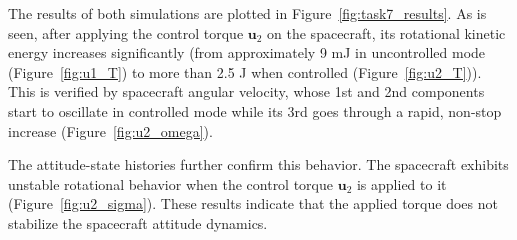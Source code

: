 \documentclass[12pt,a4paper]{report}
\begin{document}
	The results of both simulations are plotted in Figure~\ref{fig:task7_results}. As is seen, after applying the control torque $\boldsymbol{u}_2$ on the spacecraft, its rotational kinetic energy increases significantly (from approximately 9 mJ in uncontrolled mode (Figure~\ref{fig:u1_T}) to more than 2.5 J when controlled (Figure~\ref{fig:u2_T})). This is verified by spacecraft angular velocity, whose 1st and 2nd components start to oscillate in controlled mode while its 3rd goes through a rapid, non-stop increase (Figure~\ref{fig:u2_omega}). 
	
	The attitude-state histories further confirm this behavior. The spacecraft exhibits unstable rotational behavior when the control torque $\boldsymbol{u}_2$ is applied to it (Figure~\ref{fig:u2_sigma}). These results indicate that the applied torque does not stabilize the spacecraft attitude dynamics.
	  
\end{document}
